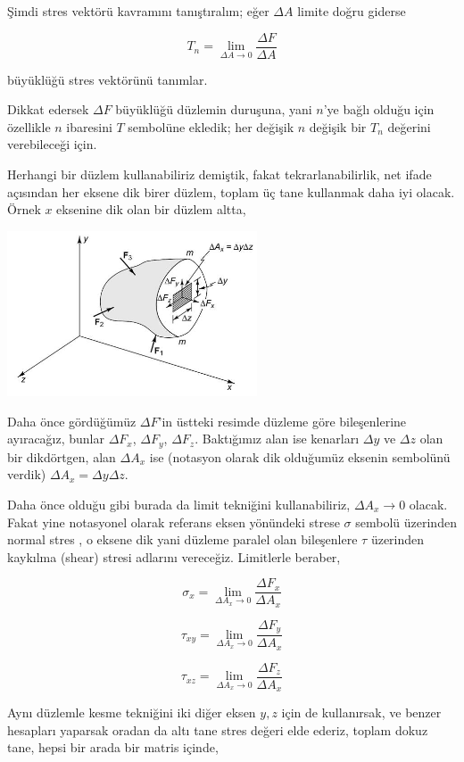 \documentclass[12pt,fleqn]{article}\usepackage{../../common}
\begin{document}
Şimdi stres vektörü kavramını tanıştıralım; eğer $\Delta A$ limite doğru giderse

$$
T_n = \lim_{\Delta A \to 0} \frac{\Delta F}{\Delta A}
$$

büyüklüğü stres vektörünü tanımlar.

Dikkat edersek $\Delta F$ büyüklüğü düzlemin duruşuna, yani $n$'ye bağlı olduğu
için özellikle $n$ ibaresini $T$ sembolüne ekledik; her değişik $n$ değişik bir
$T_n$ değerini verebileceği için.

Herhangi bir düzlem kullanabiliriz demiştik, fakat tekrarlanabilirlik, net ifade
açısından her eksene dik birer düzlem, toplam üç tane kullanmak daha iyi
olacak. Örnek $x$ eksenine dik olan bir düzlem altta,

\includegraphics[width=20em]{phy_020_strs_02_18.jpg}

Daha önce gördüğümüz $\Delta F$'in üstteki resimde düzleme göre bileşenlerine
ayıracağız, bunlar $\Delta F_x$, $\Delta F_y$, $\Delta F_z$. Baktığımız alan ise
kenarları $\Delta y$ ve $\Delta z$ olan bir dikdörtgen, alan $\Delta A_x$ ise
(notasyon olarak dik olduğumüz eksenin sembolünü verdik)
$\Delta A_x = \Delta y \Delta z$.

Daha önce olduğu gibi burada da limit tekniğini kullanabiliriz, $\Delta A_x \to
0$ olacak. Fakat yine notasyonel olarak referans eksen yönündeki strese $\sigma$
sembolü üzerinden normal stres , o eksene dik yani düzleme paralel olan
bileşenlere $\tau$ üzerinden kaykılma (shear) stresi adlarını vereceğiz.
Limitlerle beraber,

$$
\sigma_x = \lim_{\Delta A_x \to 0 } \frac{\Delta F_x}{\Delta A_x}
$$

$$
\tau_{xy} = \lim_{\Delta A_x \to 0 } \frac{\Delta F_y}{\Delta A_x}
$$

$$
\tau_{xz} = \lim_{\Delta A_x \to 0 } \frac{\Delta F_z}{\Delta A_x}
$$

Aynı düzlemle kesme tekniğini iki diğer eksen $y,z$ için de kullanırsak, ve
benzer hesapları yaparsak oradan da altı tane stres değeri elde ederiz, toplam
dokuz tane, hepsi bir arada bir matris içinde,
\end{document}
